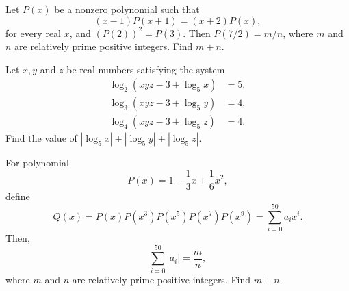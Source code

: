 \documentclass[11pt]{article}
\theoremstyle{definition}
\begin{document}
%	







\begin{question}[name={2016 AIME I, \href{https://artofproblemsolving.com/community/c4p5966192}{Problem 11}}]
	Let $P(x)$ be a nonzero polynomial such that $$(x-1)P(x+1)=(x+2)P(x),$$ for every real $x$, and $\left(P(2)\right)^2 = P(3)$. Then $P(7/2)={m}/{n}$, where $m$ and $n$ are relatively prime positive integers. Find $m + n$.
\end{question}


%	













\begin{question}[name={2016 AIME II, \href{https://artofproblemsolving.com/community/c4p6023524}{Problem 3}}]
	Let $x,y$ and $z$ be real numbers satisfying the system\begin{align*}
		\log_2(xyz-3+\log_5 x) &= 5, \\
		\log_3(xyz-3+\log_5 y) &= 4, \\
		\log_4(xyz-3+\log_5 z) &= 4.
	\end{align*}Find the value of $|\log_5 x|+|\log_5 y|+|\log_5 z|$.
\end{question}


%	







\begin{question}[name={2016 AIME II, \href{https://artofproblemsolving.com/community/c4p6023562}{Problem 6}}]
	For polynomial $$P(x)=1-\frac{1}{3}x+\frac{1}{6}x^2,$$ define\[ Q(x) = P(x)P(x^3)P(x^5)P(x^7)P(x^9) = \sum\limits_{i=0}^{50}a_ix^i. \]Then, $$\sum\limits_{i=0}^{50}|a_i|=\frac{m}{n},$$ where $m$ and $n$ are relatively prime positive integers. Find $m+n$.
\end{question}
\end{document}

